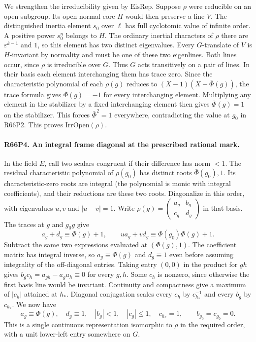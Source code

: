 We strengthen the irreducibility given by $\mathrm{EisRep}$.
Suppose $\rho$ were reducible on an open subgroup. Its open normal
core $H$ would then preserve a line $V$. The distinguished inertia
element $s_0$ over $\ell$ has full cyclotomic value of infinite
order. A positive power $s_0^n$ belongs to $H$. The ordinary
inertial characters of $\rho$ there are $\varepsilon^{k-1}$ and
$1$, so this element has two distinct eigenvalues. Every $G$-translate
of $V$ is $H$-invariant by normality and must be one of these two
eigenlines. Both lines occur, since $\rho$ is irreducible over $G$.
Thus $G$ acts transitively on a pair of lines. In their basis each
element interchanging them has trace zero. Since the characteristic
polynomial of each $\rho(g)$ reduces to
$(X-1)(X-\bar\Phi(g))$, the trace formula gives
$\bar\Phi(g)=-1$ for every interchanging element. Multiplying any
element in the stabilizer by a fixed interchanging element then
gives $\bar\Phi(g)=1$ on the stabilizer. This forces
$\bar\Phi^2=1$ everywhere, contradicting the value at $g_0$ in
R66P2. This proves $\mathrm{IrrOpen}(\rho)$.

\paragraph{R66P4. An integral frame diagonal at the prescribed rational mark.}
In the field $E$, call two scalars congruent if their difference
has norm $<1$. The residual characteristic polynomial of $\rho(g_0)$
has distinct roots $\bar\Phi(g_0),1$. Its characteristic-zero
roots are integral (the polynomial is monic with integral
coefficients), and their reductions are these two roots. Diagonalize
in this order, with eigenvalues $u,v$ and $|u-v|=1$. Write
$\rho(g)=\left(\begin{smallmatrix}a_g&b_g\\c_g&d_g\end{smallmatrix}\right)$
in that basis. The traces at $g$ and $g_0g$ give
\[
    a_g+d_g\equiv\Phi(g)+1,\qquad
    u a_g+v d_g\equiv\Phi(g_0)\Phi(g)+1 .
\]
Subtract the same two expressions evaluated at $(\Phi(g),1)$.
The coefficient matrix has integral inverse, so
$a_g\equiv\Phi(g)$ and $d_g\equiv1$ even before assuming
integrality of the off-diagonal entries. Taking entry $(0,0)$ in
the product for $gh$ gives $b_gc_h=a_{gh}-a_ga_h\equiv0$ for
every $g,h$. Some $c_h$ is nonzero, since otherwise the first
basis line would be invariant. Continuity and compactness give a
maximum of $|c_h|$ attained at $h_*$. Diagonal conjugation
scales every $c_h$ by $c_{h_*}^{-1}$ and every $b_g$ by $c_{h_*}$.
We now have
\[
    a_g\equiv\Phi(g),\quad d_g\equiv1,\quad
    |b_g|<1,\quad |c_g|\le1,\quad c_{h_*}=1,
    \qquad b_{g_0}=c_{g_0}=0 .
\]
This is a single continuous representation isomorphic to $\rho$
in the required order, with a unit lower-left entry somewhere on $G$.

